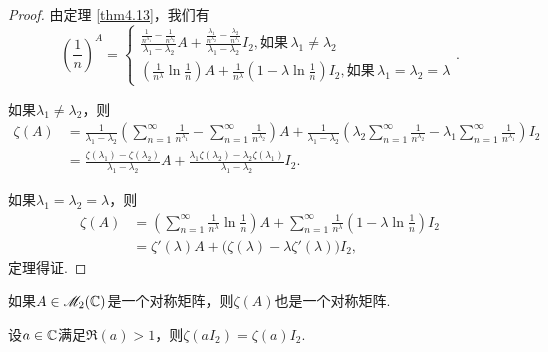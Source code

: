 \begin{proof}
  由定理 \ref{thm4.13}，我们有
  \[
    \left(\frac1n\right)^A = \begin{cases}
      \frac{\frac1{n^{\lambda_1}} - \frac1{n^{\lambda_2}}}{\lambda_1-\lambda_2}A + \frac{\frac{\lambda_1}{n^{\lambda_2}} - \frac{\lambda_2}{n^{\lambda_1}}}{\lambda_1-\lambda_2}
      I_2, \text{如果}\, \lambda_1 \ne \lambda_2 \\
      \left(\frac1{n^\lambda}\ln\frac1n\right)A + \frac1{n^\lambda} \left( 1 - \lambda \ln\frac1n \right) I_2, \text{如果}\, \lambda_1=\lambda_2=\lambda
    \end{cases}.
  \]

  如果$\lambda_1\ne\lambda_2$，则
  \begin{align*}
    \zeta(A) & = \frac1{\lambda_1-\lambda_2} \left( \sum_{n=1}^\infty \frac1{n^{\lambda_1}} - \sum_{n=1}^\infty \frac1{n^{\lambda_2}} \right) A + \frac1{\lambda_1-\lambda_2} \left( \lambda_2\sum_{n=1}^\infty \frac1{n^{\lambda_2}} - \lambda_1\sum_{n=1}^\infty \frac1{n^{\lambda_1}} \right)I_2 \\
    & = \frac{\zeta(\lambda_1)-\zeta(\lambda_2)}{
        \lambda_1-\lambda_2}A + \frac{\lambda_1\zeta(\lambda_2)-\lambda_2\zeta
        (\lambda_1)}{\lambda_1-\lambda_2}I_2.
  \end{align*}

  如果$\lambda_1=\lambda_2=\lambda$，则
  \begin{align*}
    \zeta(A) & = \left(\sum_{n=1}^\infty \frac1{n^\lambda} \ln\frac1n\right) A + \sum_{n=1}^\infty \frac1{n^\lambda} \left(1-\lambda\ln\frac1n\right)I_2 \\
    & = \zeta'(\lambda)A + \big(\zeta(\lambda)-\lambda\zeta'(\lambda)\big)
        I_2,
  \end{align*}
  定理得证.
\end{proof}

\begin{corollary}
  如果$A\in\mathscr M_2(\mathbb C)$是一个对称矩阵，则$\zeta(A)$也是一个对称矩阵.
\end{corollary}

\begin{corollary}
  设$a\in\mathbb C$满足$\Re(a)>1$，则$\zeta(aI_2)=\zeta(a)I_2$.
\end{corollary}

